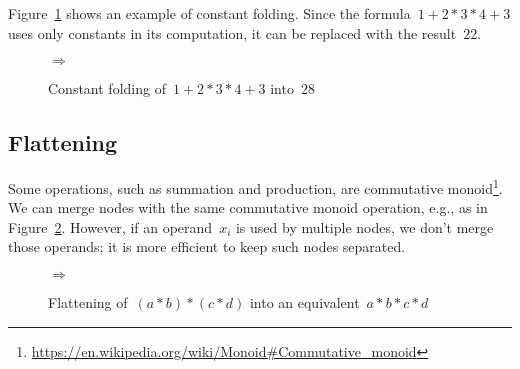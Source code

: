 \documentclass{article}
\begin{document}
Figure~\ref{fig:optimization:folding-example} shows an example of constant folding.
Since the formula~$1 + 2 * 3 * 4 + 3$ uses only constants in its computation, it can be replaced with the result~$22$.
%
\begin{figure}
  \centering
  \quad$\Rightarrow$\quad
  \caption{Constant folding of~$1 + 2 * 3 * 4 + 3$  into~$28$}
  \label{fig:optimization:folding-example}
\end{figure}

\subsection{Flattening}

Some operations, such as summation and production, are commutative monoid\footnote{
  \url{https://en.wikipedia.org/wiki/Monoid\#Commutative_monoid}
}.
We can merge nodes with the same commutative monoid operation, e.g., as in Figure~\ref{fig:optimization:flatten-example}.
However, if an operand~$x_i$ is used by multiple nodes, we don't merge those operands; it is more efficient to keep such nodes separated.
%
\begin{figure}
  \centering
  \quad$\Rightarrow$\quad
  \caption{Flattening of~$(a * b) * (c * d)$ into an equivalent~$a * b * c * d$}
  \label{fig:optimization:flatten-example}
\end{figure}
\end{document}
